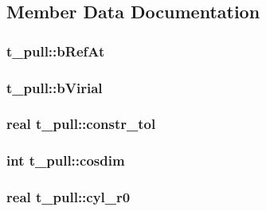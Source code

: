 \subsection{\-Member \-Data \-Documentation}
\hypertarget{structt__pull_acaaf0051a32c6ce15716d1479cce3ff0}{
\subsubsection[{b\-Ref\-At}]{ {\bf t\-\_\-pull\-::b\-Ref\-At}}}\label{structt__pull_acaaf0051a32c6ce15716d1479cce3ff0}
\hypertarget{structt__pull_aa3ec8100ab67ac5940297010877fe8e7}{
\subsubsection[{b\-Virial}]{ {\bf t\-\_\-pull\-::b\-Virial}}}\label{structt__pull_aa3ec8100ab67ac5940297010877fe8e7}
\hypertarget{structt__pull_a362b4558908b00c8e7140ec62c508c6d}{
\subsubsection[{constr\-\_\-tol}]{\setlength{\rightskip}{0pt plus 5cm}real {\bf t\-\_\-pull\-::constr\-\_\-tol}}}\label{structt__pull_a362b4558908b00c8e7140ec62c508c6d}
\hypertarget{structt__pull_adf9f59241b23f5612a8145c88c59c9eb}{
\subsubsection[{cosdim}]{\setlength{\rightskip}{0pt plus 5cm}int {\bf t\-\_\-pull\-::cosdim}}}\label{structt__pull_adf9f59241b23f5612a8145c88c59c9eb}
\hypertarget{structt__pull_a842c5a9c122239c4d86f769d3b281aa6}{
\subsubsection[{cyl\-\_\-r0}]{\setlength{\rightskip}{0pt plus 5cm}real {\bf t\-\_\-pull\-::cyl\-\_\-r0}}}\label{structt__pull_a842c5a9c122239c4d86f769d3b281aa6}
